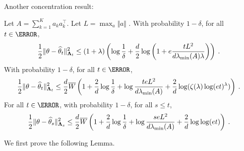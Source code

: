 
Another concentration result:
\begin{theorem}
Let $A = \sum_{k=1}^K a_k a_k^\top$. Let $L = \max_a \Vert a \Vert$ . With probability $1- \delta$, for all $t\in \N$,
\begin{align*}
\frac{1}{2}\Vert \theta - \widehat{\theta}_t \Vert_{{\boldsymbol \Lambda}_t}^2
\le (1+\lambda)\left(
	\log\frac{1}{\delta}
	+ \frac{d}{2}\log\left( 1 + e\frac{t L^2}{d \lambda_{\min}(A) \lambda} \right)
\right) \: .
\end{align*}
With probability $1- \delta$, for all $t\in \N$,
\begin{align*}
\frac{1}{2}\Vert \theta - \widehat{\theta}_t \Vert_{{\boldsymbol \Lambda}_t}^2
\le \frac{d}{2}\overline{W}\left(
	1 + \frac{2}{d}\log\frac{1}{\delta}
	+ \log \frac{t e L^2}{d \lambda_{\min}(A) }
	+ \frac{2}{d}\log(\zeta(\lambda)\log(et)^\lambda)
 \right) \: .
\end{align*}
For all $t\in\N$, with probability $1- \delta$, for all $s\le t$,
\begin{align*}
\frac{1}{2}\Vert \theta - \widehat{\theta}_s \Vert_{{\boldsymbol \Lambda}_s}^2
\le \frac{d}{2}\overline{W}\left(
	1 + \frac{2}{d}\log\frac{1}{\delta}
	+ \log \frac{s e L^2}{d \lambda_{\min}(A) }
	+ \frac{2}{d}\log\log(et)
 \right) \: .
\end{align*}
\end{theorem}

We first prove the following Lemma.

